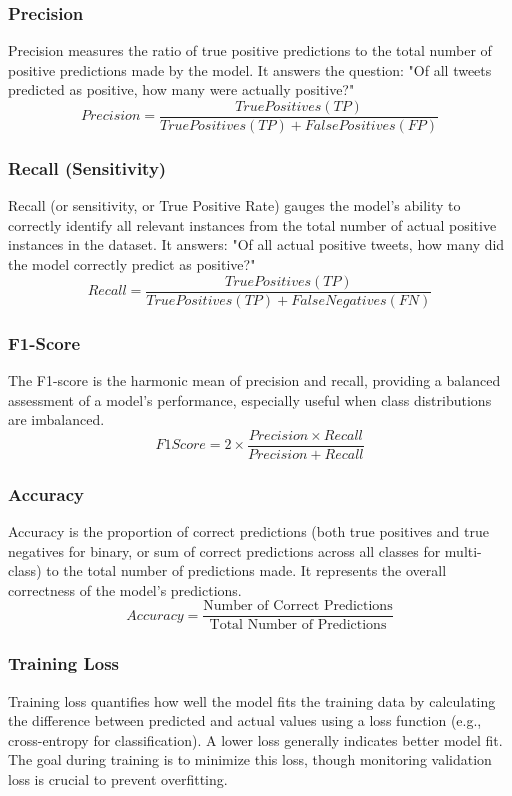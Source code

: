 \subsubsection{Precision}
Precision measures the ratio of true positive predictions to the total number of positive predictions made by the model. It answers the question: "Of all tweets predicted as positive, how many were actually positive?"
$$Precision=\frac{True Positives (TP)}{True Positives (TP)+False Positives (FP)}$$

\subsubsection{Recall (Sensitivity)}
Recall (or sensitivity, or True Positive Rate) gauges the model’s ability to correctly identify all relevant instances from the total number of actual positive instances in the dataset. It answers: "Of all actual positive tweets, how many did the model correctly predict as positive?"
$$Recall=\frac{True Positives (TP)}{True Positives (TP)+False Negatives (FN)}$$

\subsubsection{F1-Score}
The F1-score is the harmonic mean of precision and recall, providing a balanced assessment of a model’s performance, especially useful when class distributions are imbalanced.
$$F1Score=2 \times \frac{Precision \times Recall}{Precision+Recall}$$

\subsubsection{Accuracy}
Accuracy is the proportion of correct predictions (both true positives and true negatives for binary, or sum of correct predictions across all classes for multi-class) to the total number of predictions made. It represents the overall correctness of the model's predictions.
$$Accuracy= \frac{\text{Number of Correct Predictions}}{\text{Total Number of Predictions}}$$


\subsubsection{Training Loss}
Training loss quantifies how well the model fits the training data by calculating the difference between predicted and actual values using a loss function (e.g., cross-entropy for classification). A lower loss generally indicates better model fit. The goal during training is to minimize this loss, though monitoring validation loss is crucial to prevent overfitting.